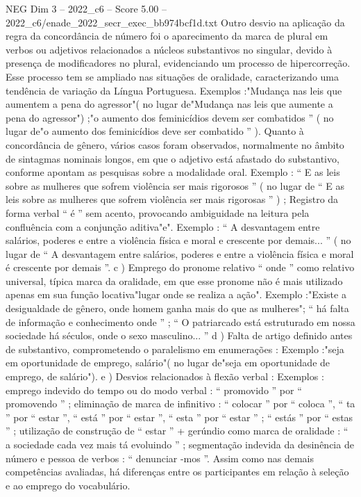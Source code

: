 \begin{textsample}{NEG Dim 3 – 2022\_c6 – Score 5.00 – 2022\_c6/enade\_2022\_secr\_exec\_bb974bcf1d.txt}
Outro desvio na aplicação da regra da concordância de número foi o aparecimento da marca de plural em verbos ou adjetivos relacionados a núcleos substantivos no singular, devido à presença de modificadores no plural, evidenciando um processo de hipercorreção.
Esse processo tem se ampliado nas situações de oralidade, caracterizando uma tendência de variação da Língua Portuguesa.
Exemplos :"Mudança nas leis que aumentem a pena do agressor"( no lugar de"Mudança nas leis que aumente a pena do agressor") ;"o aumento dos feminicídios devem ser combatidos ” ( no lugar de"o aumento dos feminicídios deve ser combatido ” ).
Quanto à concordância de gênero, vários casos foram observados, normalmente no âmbito de sintagmas nominais longos, em que o adjetivo está afastado do substantivo, conforme apontam as pesquisas sobre a modalidade oral.
Exemplo : “ E as leis sobre as mulheres que sofrem violência ser mais rigorosos ” ( no lugar de “ E as leis sobre as mulheres que sofrem violência ser mais rigorosas ” ) ; Registro da forma verbal “ é ” sem acento, provocando ambiguidade na leitura pela confluência com a conjunção aditiva"e".
Exemplo : “ A desvantagem entre salários, poderes e entre a violência física e moral e crescente por demais... ” ( no lugar de “ A desvantagem entre salários, poderes e entre a violência física e moral é crescente por demais ”. c ) Emprego do pronome relativo “ onde ” como relativo universal, típica marca da oralidade, em que esse pronome não é mais utilizado apenas em sua função locativa"lugar onde se realiza a ação".
Exemplo :"Existe a desigualdade de gênero, onde homem ganha mais do que as mulheres"; “ há falta de informação e conhecimento onde ” ; “ O patriarcado está estruturado em nossa sociedade há séculos, onde o sexo masculino... ” d ) Falta de artigo definido antes de substantivo, comprometendo o paralelismo em enumerações : Exemplo :"seja em oportunidade de emprego, salário"( no lugar de"seja em oportunidade de emprego, de salário"). e ) Desvios relacionados à flexão verbal : Exemplos : emprego indevido do tempo ou do modo verbal : “ promovido ” por “ promovendo ” ; eliminação de marca de infinitivo : “ colocar ” por “ coloca ”, “ ta ” por “ estar ”, “ está ” por “ estar ”, “ esta ” por “ estar ” ; “ estás ” por “ estas ” ; utilização de construção de “ estar ” + gerúndio como marca de oralidade : “ a sociedade cada vez mais tá evoluindo ” ; segmentação indevida da desinência de número e pessoa de verbos : “ denunciar -mos ”.
Assim como nas demais competências avaliadas, há diferenças entre os participantes em relação à seleção e ao emprego do vocabulário.

\end{textsample}
